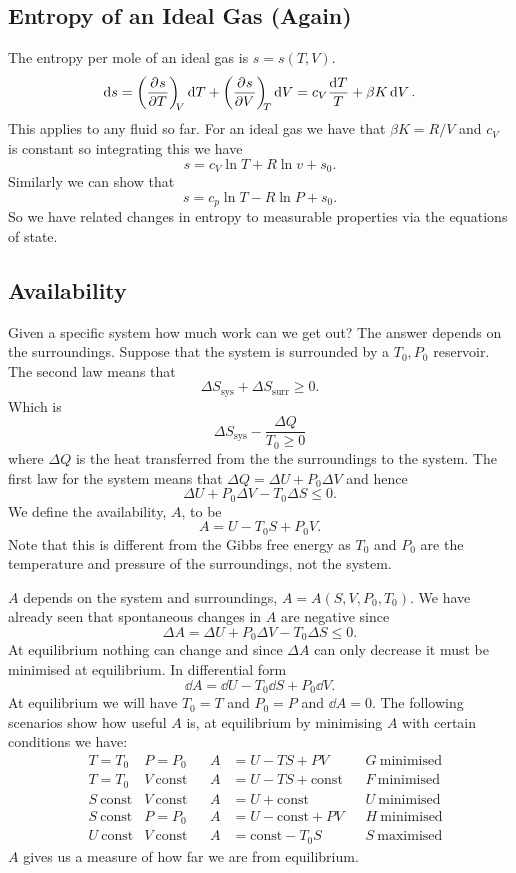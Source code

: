 \documentclass[a4paper]{article}
\newcommand{\sys}{{\mathrm{sys}}}
\newcommand{\surr}{{\mathrm{surr}}}
\begin{document}
    \subsection{Entropy of an Ideal Gas (Again)}
    The entropy per mole of an ideal gas is \(s = s(T, V)\).
    \[\dd{s} = \left(\pdv[]{s}{T}\right)_{\!\!{V}}\dd{T} + \left(\pdv[]{s}{V}\right)_{\!\!{T}}\dd{V} = c_V\frac{\dd{T}}{T} + \beta K\dd{V}.\]
    This applies to any fluid so far.
    For an ideal gas we have that \(\beta K = R/V\) and \(c_V\) is constant so integrating this we have
    \[s = c_V\ln T + R\ln v + s_0.\]
    Similarly we can show that
    \[s = c_p\ln T - R\ln P + s_0.\]
    So we have related changes in entropy to measurable properties via the equations of state.
    
    \subsection{Availability}
    Given a specific system how much work can we get out?
    The answer depends on the surroundings.
    Suppose that the system is surrounded by a \(T_0, P_0\) reservoir.
    The second law means that
    \[\Delta S_\sys  + \Delta S_\surr \ge 0.\]
    Which is
    \[\Delta S_\sys - \frac{\Delta Q}{T_0 \ge 0}\]
    where \(\Delta Q\) is the heat transferred from the the surroundings to the system.
    The first law for the system means that \(\Delta Q = \Delta U + P_0\Delta V\) and hence
    \[\Delta U + P_0\Delta V - T_0\Delta S \le 0.\]
    We define the availability, \(A\), to be
    \[A = U - T_0S + P_0V.\]
    Note that this is different from the Gibbs free energy as \(T_0\) and \(P_0\) are the temperature and pressure of the surroundings, not the system.
    
    \(A\) depends on the system and surroundings, \(A = A(S, V, P_0, T_0)\).
    We have already seen that spontaneous changes in \(A\) are negative since
    \[\Delta A = \Delta U + P_0\Delta V - T_0\Delta S \le 0.\]
    At equilibrium nothing can change and since \(\Delta A\) can only decrease it must be minimised at equilibrium.
    In differential form
    \[\dd{A} = \dd{U} - T_0\dd{S} + P_0\dd{V}.\]
    At equilibrium we will have \(T_0 = T\) and \(P_0 = P\) and \(\dd{A} = 0\).
    The following scenarios show how useful \(A\) is, at equilibrium by minimising \(A\) with certain conditions we have:
    \begin{align*}
        &T = T_0 & P = P_0 && A &= U - TS + PV && G~\text{minimised}\\
        &T = T_0 & V~\text{const} && A &= U - TS + \text{const} && F~\text{minimised}\\
        &S~\text{const} & V~\text{const} && A &= U + \text{const} && U~\text{minimised}\\
        &S~\text{const} & P = P_0 && A &= U - \text{const} + PV && H~\text{minimised}\\
        &U~\text{const} & V~\text{const} && A &= \text{const} - T_0S && S~\text{maximised}
    \end{align*}
    \(A\) gives us a measure of how far we are from equilibrium.
    
\end{document}
